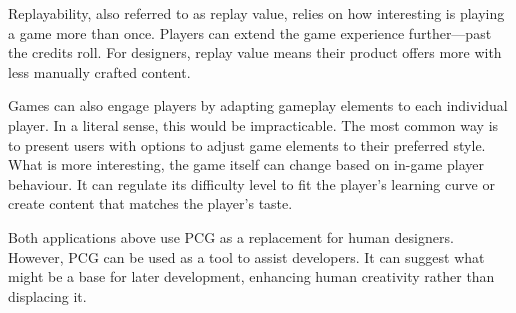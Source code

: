 



Replayability, also referred to as replay value, relies on how interesting is playing a game more than once. Players can extend the game experience further---past the credits roll. For designers, replay value means their product offers more with less manually crafted content.


Games can also engage players by adapting gameplay elements to each individual player. In a literal sense, this would be impracticable. The most common way is to present users with options to adjust game elements to their preferred style. What is more interesting, the game itself can change based on in-game player behaviour. It can regulate its difficulty level to fit the player's learning curve or create content that matches the player's taste.


Both applications above use PCG as a replacement for human designers. However, PCG can be used as a tool to assist developers. It can suggest what might be a base for later development, enhancing human creativity rather than displacing it. 


